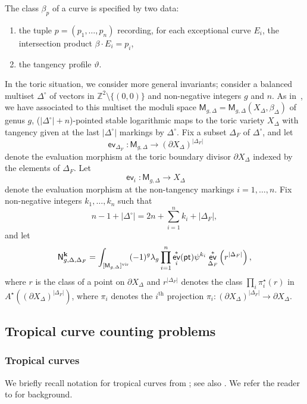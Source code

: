 \documentclass[11pt]{amsart}
\numberwithin{equation}{section}
\theoremstyle{plain}
\theoremstyle{remark}
\theoremstyle{definition}
\DeclareMathOperator{\ev}{\mathsf{ev}}
\newcommand{\ZZ}{\mathbb{Z}}
\newcommand{\vir}{\text{\rm vir}}
\newcommand{\supth}[1]{\ensuremath{#1^{\mathrm{th}}}}
\begin{document}
The class $\beta_p$ of a curve is specified by two data: 
\begin{enumerate}
    \item the tuple $p = (p_1,\dots,p_n)$ recording, for each exceptional curve $E_i$, the intersection product $\beta \cdot E_i = p_i$, 
    \item the tangency profile $\vartheta$.
\end{enumerate}
In the toric situation, we consider more general invariants; consider a balanced multiset $\Delta^{\circ}$ of vectors in $\ZZ^2\setminus \{(0,0)\}$ and non-negative integers $g$ and $n$. As in~\cite[Section 2.1]{kennedyhunt2023tropical}, we have associated to this multiset the moduli space $\mathsf{M}_{g,\Delta} = \mathsf{M}_{g,\Delta}(X_{\Delta},\beta_{\Delta})$ of genus $g$, ($|\Delta^{\circ}| + n$)-pointed stable logarithmic maps to the toric variety $X_{\Delta}$ with tangency given at the last $|\Delta^{\circ}|$ markings by $\Delta^{\circ}$. Fix  a subset $\Delta_F$ of $\Delta^{\circ}$, and let
$$ \ev_{\Delta_F} \colon \mathsf{M}_{g,\Delta} \longrightarrow (\partial X_{\Delta})^{|\Delta_F|}$$
denote the evaluation morphism at the toric boundary divisor $\partial X_{\Delta}$ indexed by the elements of $\Delta_F$. Let
$$\ev_i \colon \mathsf{M}_{g,\Delta} \longrightarrow X_{\Delta}$$
denote the evaluation morphism at the non-tangency markings $i=1,\dots,n$. Fix non-negative integers $k_1,\dots,k_n$ such that
$$n-1 + |\Delta^{\circ}| = 2n + \sum_{i=1}^n k_i + |\Delta_F|,$$
and let
$$\mathsf{N}_{g,\Delta,\Delta_F}^{\bf{k}} = \int_{[\mathsf{M}_{g,\Delta}]^{\vir}} (-1)^{g} \lambda_{g} \prod_{i=1}^{n} \ev_{i}^{*}(\mathsf{pt})\psi^{k_i} \ev_{\Delta_F}^* \left(r^{|\Delta_{F}|}\right),$$
where $r$ is the class of a point on $\partial X_{\Delta}$ and $r^{|\Delta_{F}|}$ denotes the class $\prod_i\pi_i^\star (r)$ in $A^\star \left((\partial X_{\Delta})^{|\Delta_F|}\right)$, where $\pi_i$ denotes the $\supth{i}$ projection $\pi_i \colon (\partial X_{\Delta})^{|\Delta_F|} \rightarrow \partial X_{\Delta}$.

\subsection{Tropical curve counting problems}

\subsubsection{Tropical curves} We briefly recall notation for tropical curves from \cite{kennedyhunt2023tropical}; see also \cite[Section~2.3]{bousseau2018tropical}. We refer the reader to \cite{abramovich2020decomposition,MandelRuddat,Milk,NishSieb06} for background.
\end{document}

